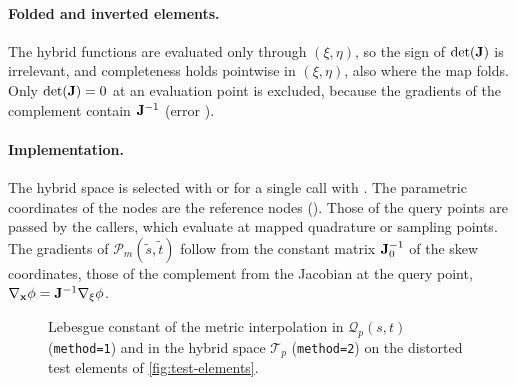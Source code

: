 \paragraph{Folded and inverted elements.} The hybrid functions are evaluated only
through $(\xi,\eta)$, so the sign of $\det(\mathbf{J})$ is irrelevant, and completeness
holds pointwise in $(\xi,\eta)$, also where the map folds. Only $\det(\mathbf{J})=0$ at
an evaluation point is excluded, because the gradients of the complement contain
$\mathbf{J}^{-1}$ (error ).

\paragraph{Implementation.} The hybrid space is selected with
 or for a single call with
. The parametric coordinates of the
nodes are the reference nodes (). Those of the query points
are passed by the callers, which evaluate at mapped quadrature or sampling points.
The gradients of $\mathcal P_m(\tilde s,\tilde t)$ follow from the constant matrix
$\mathbf{J}_0^{-1}$ of the skew coordinates, those of the complement from the Jacobian
at the query point, $\nabla_{\mathbf{x}}\phi=\mathbf{J}^{-1}\nabla_{\xi}\phi$.

\begin{figure}[htbp]
  \centering
  \caption{Lebesgue constant of the metric interpolation in $\mathcal Q_p(s,t)$
    (\texttt{method=1}) and in the hybrid space $\mathcal T_p$ (\texttt{method=2}) on
    the distorted test elements of \cref{fig:test-elements}.}
  \label{fig:metric-basis-leb}
\end{figure}
